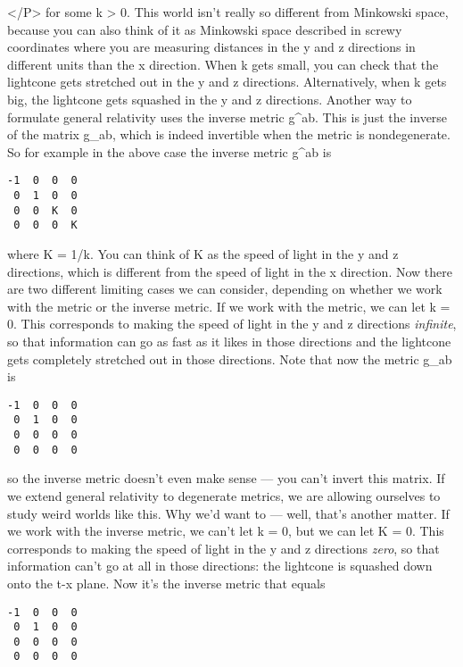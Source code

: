 </P>
for some k > 0.  This world isn't really so different from
Minkowski space, because you can also think of it as Minkowski
space described in screwy coordinates where you are measuring
distances in the y and z directions in different units than the x
direction.   When k gets small, you can check that the lightcone
gets stretched out in the y and z directions.  Alternatively,
when k gets big, the lightcone gets squashed in the y and z
directions.  
Another way to formulate general relativity uses the inverse
metric g^{ab}.  This is just the inverse of the matrix g_{ab},
which is indeed invertible when the metric is nondegenerate.
So for example in the above case the inverse metric g^{ab} is
\begin{verbatim}
-1  0  0  0
 0  1  0  0
 0  0  K  0
 0  0  0  K
\end{verbatim}
    
where K = 1/k.  You can think of K as the speed of light in the
y and z directions, which is different from the speed of light in
the x direction.  
Now there are two different limiting cases we can consider,
depending on whether we work with the metric or the inverse
metric.  If we work with the metric, we can let k = 0.  This
corresponds to making the speed of light in the y and z
directions \emph{infinite}, so that information can go as fast as it
likes in those directions and the lightcone gets completely
stretched out in those directions.   Note that now the metric
g_{ab} is
\begin{verbatim}
-1  0  0  0
 0  1  0  0
 0  0  0  0
 0  0  0  0
\end{verbatim}
    
so the inverse metric doesn't even make sense --- you can't
invert this matrix.  If we extend general relativity to
degenerate metrics, we are allowing ourselves to study weird
worlds like this.  Why we'd want to --- well, that's another
matter.
If we work with the inverse metric, we can't let k = 0, but we
can let K = 0.  This corresponds to making the speed of light in
the y and z directions \emph{zero}, so that information can't go at
all in those directions: the lightcone is squashed down onto the
t-x plane.   Now it's the inverse metric that equals
\begin{verbatim}
-1  0  0  0
 0  1  0  0
 0  0  0  0
 0  0  0  0
\end{verbatim}
    
